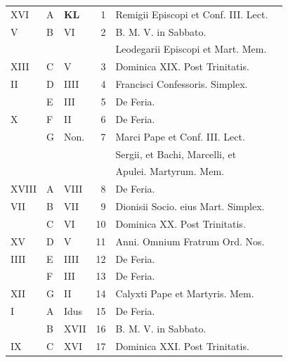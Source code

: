 \begin{center}
\begin{tabular}{l | l | l | r | l l}
\color{Red} XVI & \color{Red} A & \textbf{\color{Red} K\color{Blue}L} & 1 & \color{Red} Remigii Episcopi et Conf. III. Lect. \\
\color{Red} V & B & \color{Red} VI & 2 & B. M. V. in Sabbato. \\
& & & & \quad \color{Red} Leodegarii Episcopi et Mart. Mem. \\
\color{Red} XIII & C & \color{Red} V & 3 & Dominica XIX. Post Trinitatis. & \color{Red} \\
\color{Red} II & D & \color{Red} IIII & 4 & Francisci Confessoris. Simplex. & \color{Red} \\
\color{Red}  & E & \color{Red} III & 5 & De Feria. & \color{Red} \\
\color{Red} X & F & \color{Red} II & 6 & De Feria. & \color{Red} \\
\color{Red}  & G & \color{Red} Non. & 7 & Marci Pape et Conf. III. Lect. \\
 &  & & & \multicolumn{2}{l}{\quad Sergii, et Bachi, Marcelli, et} \\
 &  & & & \multicolumn{2}{l}{\quad Apulei. Martyrum. Mem.} \\
\color{Red} XVIII & \color{Red} A & \color{Red} VIII & 8 & De Feria. & \color{Red} \\
\color{Red} VII & B & \color{Red} VII & 9 & \multicolumn{2}{l}{\color{Red} Dionisii Socio. eius Mart. Simplex.} \\
\color{Red}  & C & \color{Red} VI & 10 & Dominica XX. Post Trinitatis. & \color{Red} \\
\color{Red} XV & D & \color{Red} V & 11 & \multicolumn{2}{l}{\color{Red} Anni. Omnium Fratrum Ord. Nos.} \\
\color{Red} IIII & E & \color{Red} IIII & 12 & De Feria. & \color{Red} \\
\color{Red}  & F & \color{Red} III & 13 & De Feria. & \color{Red} \\
\color{Red} XII & G & \color{Red} II & 14 & Calyxti Pape et Martyris. Mem. & \color{Red} \\
\color{Red} I & \color{Red} A & \color{Red} Idus & 15 & De Feria. & \color{Red} \\
\color{Red}  & B & \color{Red} XVII & 16 & B. M. V. in Sabbato.  & \color{Red} \\
\color{Red} IX & C & \color{Red} XVI & 17 & Dominica XXI. Post Trinitatis.  & \color{Red} \\

\end{tabular}
\end{center}
